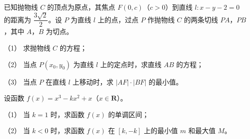 \begin{question}
已知抛物线 $C$ 的顶点为原点，其焦点 $F(0,c)$（$c>0$）到直线 $l:x-y-2=0$ 的距离为 $\dfrac{3\sqrt2}2$。设 $P$ 为直线 $l$ 上的点，过点 $P$ 作抛物线 $C$ 的两条切线 $PA$，$PB$，其中 $A$，$B$ 为切点。

（1） 求抛物线 $C$ 的方程；

（2） 当点 $P(x_0,y_0)$ 为直线 $l$ 上的定点时，求直线 $AB$ 的方程；

（3） 当点 $P$ 在直线 $l$ 上移动时，求 $|AF|\cdot|BF|$ 的最小值。

\end{question}
\begin{question}
设函数 $f(x)=x^3-kx^2+x$（$x\in\mathbf R$）。

（1） 当 $k=1$ 时，求函数 $f(x)$ 的单调区间；

（2） 当 $k<0$ 时，求函数 $f(x)$ 在 $[k,-k]$ 上的最小值 $m$ 和最大值 $M$。

\end{question}